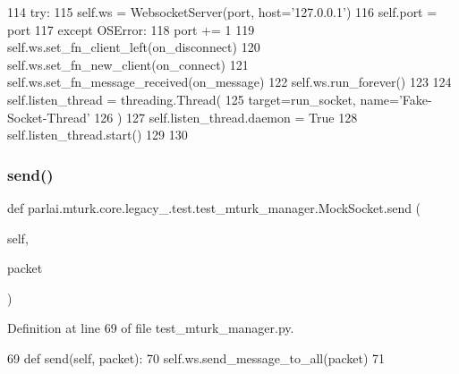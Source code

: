 \begin{DoxyCode}
114                 \textcolor{keywordflow}{try}:
115                     self.ws = WebsocketServer(port, host=\textcolor{stringliteral}{'127.0.0.1'})
116                     self.port = port
117                 \textcolor{keywordflow}{except} OSError:
118                     port += 1
119             self.ws.set\_fn\_client\_left(on\_disconnect)
120             self.ws.set\_fn\_new\_client(on\_connect)
121             self.ws.set\_fn\_message\_received(on\_message)
122             self.ws.run\_forever()
123 
124         self.listen\_thread = threading.Thread(
125             target=run\_socket, name=\textcolor{stringliteral}{'Fake-Socket-Thread'}
126         )
127         self.listen\_thread.daemon = \textcolor{keyword}{True}
128         self.listen\_thread.start()
129 
130 
\end{DoxyCode}
\mbox{\label{classparlai_1_1mturk_1_1core_1_1legacy__2018_1_1test_1_1test__mturk__manager_1_1MockSocket_aad5e72145c25f36d32dfed7f4b3e55e6}} 
\subsubsection{\texorpdfstring{send()}{send()}}
{\footnotesize\ttfamily def parlai.\+mturk.\+core.\+legacy\+\_.\+test.\+test\+\_\+mturk\+\_\+manager.\+Mock\+Socket.\+send (\begin{DoxyParamCaption}\item[{}]{self,  }\item[{}]{packet }\end{DoxyParamCaption})}



Definition at line 69 of file test\+\_\+mturk\+\_\+manager.\+py.


\begin{DoxyCode}
69     \textcolor{keyword}{def }send(self, packet):
70         self.ws.send\_message\_to\_all(packet)
71 
\end{DoxyCode}


